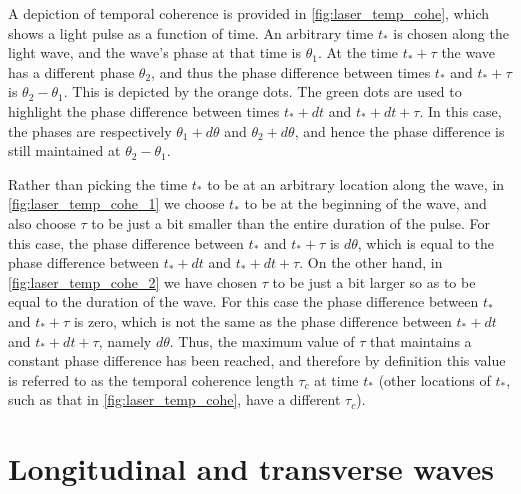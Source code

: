 \documentclass[a4paper,11pt]{report}
\begin{document}
A depiction of temporal coherence is provided in \cref{fig:laser_temp_cohe}, which shows a light pulse as a function of time. An arbitrary time $t_*$ is chosen along the light wave, and the wave's phase at that time is $\theta_1$. At the time $t_* + \tau$ the wave has a different phase $\theta_2$, and thus the phase difference between times $t_*$ and $t_*+\tau$ is $\theta_2 - \theta_1$. This is depicted by the orange dots. The green dots are used to highlight the phase difference between times $t_*+dt$ and $t_*+dt+\tau$. In this case, the phases are respectively $\theta_1 + d\theta$ and $\theta_2 + d\theta$, and hence the phase difference is still maintained at $\theta_2 - \theta_1$.

Rather than picking the time $t_*$ to be at an arbitrary location along the wave, in \cref{fig:laser_temp_cohe_1} we choose $t_*$ to be at the beginning of the wave, and also choose $\tau$ to be just a bit smaller than the entire duration of the pulse. For this case, the phase difference between $t_*$ and $t_*+\tau$ is $d\theta$, which is equal to the phase difference between $t_*+dt$ and $t_*+dt+\tau$. On the other hand, in \cref{fig:laser_temp_cohe_2} we have chosen $\tau$ to be just a bit larger so as to be equal to the duration of the wave. For this case the phase difference between $t_*$ and $t_*+\tau$ is zero, which is not the same as the phase difference between $t_*+dt$ and $t_*+dt+\tau$, namely $d\theta$. Thus, the maximum value of $\tau$ that maintains a constant phase difference has been reached, and therefore by definition this value is referred to as the temporal coherence length $\tau_c$ at time $t_*$ (other locations of $t_*$, such as that in \cref{fig:laser_temp_cohe}, have a different $\tau_c$).

\chapter{Longitudinal and transverse waves}

\end{document}
